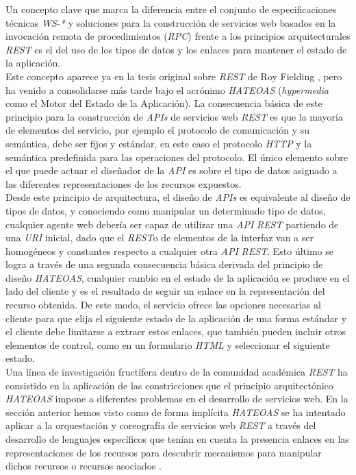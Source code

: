 Un concepto clave que marca la diferencia entre el conjunto de especificaciones t\'ecnicas \textit{WS-*} y soluciones para la construcci\'on de servicios web basados en la invocaci\'on remota de procedimientos (\textit{RPC}) frente a los principios arquitecturales \textit{REST} es el del uso de los tipos de datos y los enlaces para mantener el estado de la aplicaci\'on.\\
Este concepto aparece ya en la tesis original sobre \textit{REST} de Roy Fielding \cite{fielding2000representational}, pero ha venido a consolidarse m\'as tarde bajo el acr\'onimo \textit{HATEOAS} (\textit{hypermedia} como el Motor del Estado de la Aplicaci\'on). La consecuencia b\'asica de este principio para la construcci\'on de \textit{APIs} de servicios web \textit{REST} es que la mayor\'ia de elementos del servicio, por ejemplo el protocolo de comunicaci\'on y su sem\'antica, debe ser fijos y est\'andar, en este caso el protocolo \textit{HTTP} y la sem\'antica predefinida para las operaciones del protocolo. El \'unico elemento sobre el que puede actuar el dise\~nador de la \textit{API} es sobre el tipo de datos asignado a las diferentes representaciones de los recursos expuestos.\\
Desde este principio de arquitectura, el dise\~no de \textit{APIs} es equivalente al dise\~no de tipos de datos, y conociendo como manipular un determinado tipo de datos, cualquier agente web deber\'ia ser capaz de utilizar una \textit{API} \textit{REST} partiendo de una \textit{URI} inicial, dado que el \textit{REST}o de elementos de la interfaz van a ser homog\'eneos y constantes respecto a cualquier otra \textit{API} \textit{REST}. Esto \'ultimo se logra a trav\'es de una segunda consecuencia b\'asica derivada del principio de dise\~no \textit{HATEOAS}, cualquier cambio en el estado de la aplicaci\'on se produce en el lado del cliente y es el resultado de seguir un enlace en la representaci\'on del recurso obtenida. De este modo, el servicio ofrece las opciones necesarias al cliente para que elija el siguiente estado de la aplicaci\'on de una forma est\'andar y el cliente debe limitarse a extraer estos enlaces, que tambi\'en pueden incluir otros elementos de control, como en un formulario \textit{HTML} y seleccionar el siguiente estado.\\
Una l\'inea de investigaci\'on fruct\'ifera dentro de la comunidad acad\'emica \textit{REST} ha consistido en la aplicaci\'on de las constricciones que el principio arquitect\'onico \textit{HATEOAS} impone a diferentes problemas en el desarrollo de servicios web. En la secci\'on anterior hemos visto como de forma impl\'icita \textit{HATEOAS} se ha intentado aplicar a la orquestaci\'on y coreograf\'ia de servicios web \textit{REST} a trav\'es del desarrollo de lenguajes espec\'ificos que ten\'ian en cuenta la presencia enlaces en las representaciones de los recursos para descubrir mecanismos para manipular dichos recursos o recursos asociados \cite{alarcon2011hypermedia}.\\
